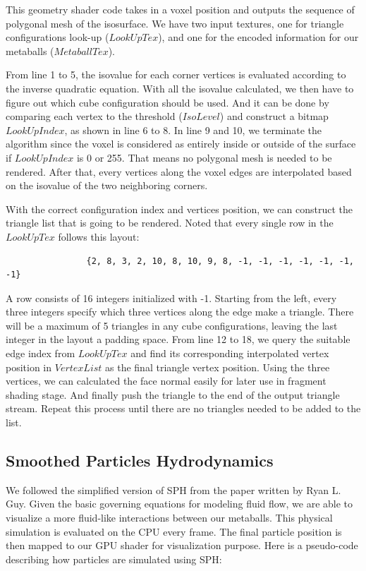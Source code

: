 \documentclass{article}
\begin{document}
\begin{multicols}{2}
			This geometry shader code takes in a voxel position and outputs the sequence of polygonal mesh of the isosurface. We have two input textures, one for triangle configurations look-up ($LookUpTex$), and one for the encoded information for our metaballs ($MetaballTex$). 
			
			From line 1 to 5, the isovalue for each corner vertices is evaluated according to the inverse quadratic equation. With all the isovalue calculated, we then have to figure out which cube configuration should be used. And it can be done by comparing each vertex to the threshold ($IsoLevel$) and construct a bitmap $LookUpIndex$, as shown in line 6 to 8. In line 9 and 10, we terminate the algorithm since the voxel is considered as entirely inside or outside of the surface if $LookUpIndex$ is 0 or 255. That means no polygonal mesh is needed to be rendered. After that, every vertices along the voxel edges are interpolated based on the isovalue of the two neighboring corners. 
			
			With the correct configuration index and vertices position, we can construct the triangle list that is going to be rendered. Noted that every single row in the $LookUpTex$ follows this layout:
			\begin{minipage}{\linewidth}
				\begin{lstlisting}
				{2, 8, 3, 2, 10, 8, 10, 9, 8, -1, -1, -1, -1, -1, -1, -1}
				\end{lstlisting}
			\end{minipage}
			A row consists of 16 integers initialized with -1. Starting from the left, every three integers specify which three vertices along the edge make a triangle. There will be a maximum of 5 triangles in any cube configurations, leaving the last integer in the layout a padding space. From line 12 to 18, we query the suitable edge index from $LookUpTex$ and find its corresponding interpolated vertex position in $VertexList$ as the final triangle vertex position. Using the three vertices, we can calculated the face normal easily for later use in fragment shading stage. And finally push the triangle to the end of the output triangle stream. Repeat this process until there are no triangles needed to be added to the list. 
        
		\subsection{Smoothed Particles Hydrodynamics}
			We followed the simplified version of SPH from the paper written by Ryan L. Guy. \cite{guy15} Given the basic governing equations for modeling fluid flow, we are able to visualize a more fluid-like interactions between our metaballs. This physical simulation is evaluated on the CPU every frame. The final particle position is then mapped to our GPU shader for visualization purpose. Here is a pseudo-code describing how particles are simulated using SPH: 
			

\end{multicols}
\end{document}
